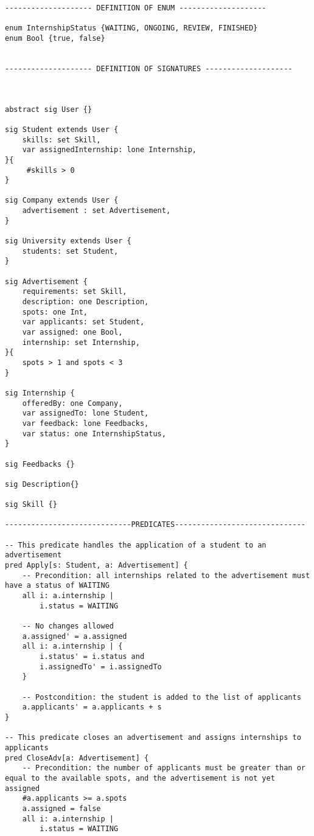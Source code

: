 \begin{lstlisting}
-------------------- DEFINITION OF ENUM --------------------

enum InternshipStatus {WAITING, ONGOING, REVIEW, FINISHED}
enum Bool {true, false}
    
    
-------------------- DEFINITION OF SIGNATURES --------------------



abstract sig User {}
    
sig Student extends User {
    skills: set Skill,
    var assignedInternship: lone Internship,
}{
	 #skills > 0
}

sig Company extends User {
	advertisement : set Advertisement,
}

sig University extends User {
    students: set Student,
}

sig Advertisement {
    requirements: set Skill,
    description: one Description,
    spots: one Int,
    var applicants: set Student,
    var assigned: one Bool,
    internship: set Internship,
}{
    spots > 1 and spots < 3 
}

sig Internship {
    offeredBy: one Company,
    var assignedTo: lone Student,
	var feedback: lone Feedbacks,
    var status: one InternshipStatus,
}

sig Feedbacks {}

sig Description{}

sig Skill {}

-----------------------------PREDICATES------------------------------

-- This predicate handles the application of a student to an advertisement
pred Apply[s: Student, a: Advertisement] {
    -- Precondition: all internships related to the advertisement must have a status of WAITING
    all i: a.internship |
        i.status = WAITING

    -- No changes allowed 
    a.assigned' = a.assigned
    all i: a.internship | {
        i.status' = i.status and
        i.assignedTo' = i.assignedTo
    }

    -- Postcondition: the student is added to the list of applicants
    a.applicants' = a.applicants + s
}

-- This predicate closes an advertisement and assigns internships to applicants
pred CloseAdv[a: Advertisement] {
    -- Precondition: the number of applicants must be greater than or equal to the available spots, and the advertisement is not yet assigned
    #a.applicants >= a.spots
    a.assigned = false
    all i: a.internship |
        i.status = WAITING


\end{lstlisting}
